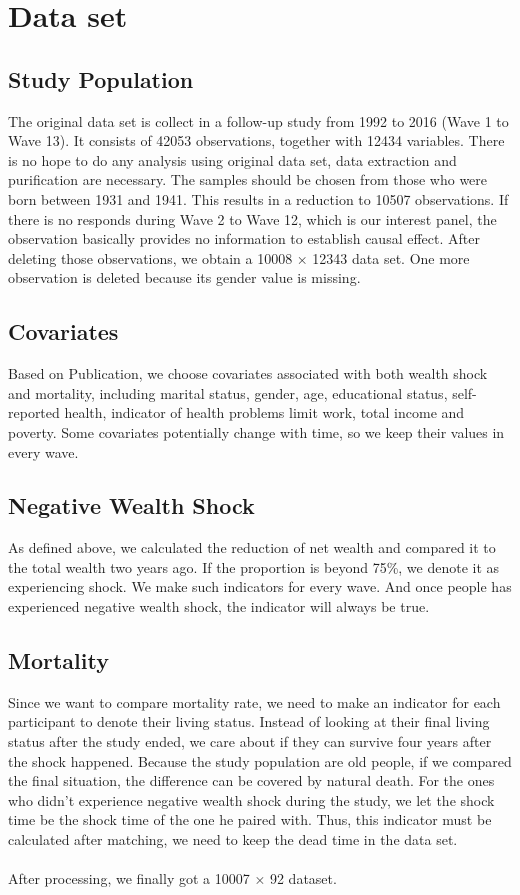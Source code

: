 \documentclass[aoas,preprint]{imsart}
\begin{document}
\section{Data set}

\subsection{Study Population}
 The original data set is collect in a follow-up study from 1992 to 2016 (Wave 1 to Wave 13). It consists of 42053 observations, together with 12434 variables. There is no hope to do any analysis using original data set, data extraction and purification are necessary. The samples should be chosen from those who were born between 1931 and 1941. This results in a reduction to 10507 observations. If there is no responds during Wave 2 to Wave 12, which is our interest panel, the observation basically provides no information to establish causal effect. After deleting those observations, we obtain a 10008 × 12343 data set. One more observation is deleted because its gender value is missing.
 
\subsection{Covariates} 
Based on Publication\cite{r3}, we choose covariates associated with both wealth shock and mortality, including marital status, gender, age, educational status, self-reported health, indicator of health problems limit work, total income and poverty. Some covariates potentially change with time, so we keep their values in every wave.

\subsection{Negative Wealth Shock}
As defined above, we calculated the reduction of net wealth and compared it to the total wealth two years ago. If the proportion is beyond 75\%, we denote it as experiencing shock. We make such indicators for every wave. And once people has experienced negative wealth shock, the indicator will always be true.

\subsection{Mortality}
Since we want to compare mortality rate, we need to make an indicator for each participant to denote their living status. Instead of looking at their final living status after the study ended, we care about if they can survive four years after the shock happened. Because the study population are old people, if we compared the final situation, the difference can be covered by natural death. For the ones who didn't experience negative wealth shock during the study, we let the shock time be the shock time of the one he paired with. Thus, this indicator must be calculated after matching, we need to keep the dead time in the data set.
\\\\
\noindent After processing, we finally got a 10007 × 92 dataset.
\end{document}
